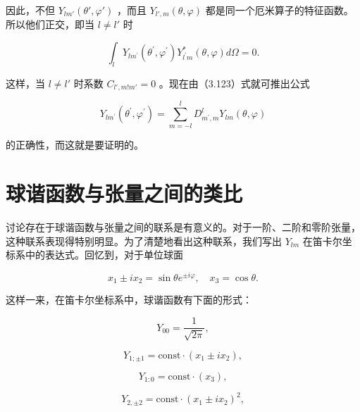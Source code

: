 因此，不但 $Y_{lm'}(\theta', \varphi')$ ，而且 $Y_{l',m}(\theta, \varphi)$ 都是同一个厄米算子的特征函数。所以他们正交，即当 $l \neq l'$ 时

\begin{equation*}
\int_ {l} Y _ {l m ^ {\prime}} \left(\theta^ {\prime}, \varphi^ {\prime}\right) Y _ {l ^ {\prime} m} ^ {*} (\theta , \varphi) d \Omega = 0.
\end{equation*}

这样，当 $l \neq l'$ 时系数 $C_{l', m!m'} = 0$ 。现在由（3.123）式就可推出公式

\begin{equation*}
Y _ {l m ^ {\prime}} \left(\theta^ {\prime}, \varphi^ {\prime}\right) = \sum_ {m = - l} ^ {l} D _ {m ^ {\prime}, m} ^ {l} Y _ {l m} (\theta , \varphi)
\end{equation*}

的正确性，而这就是要证明的。

\section{球谐函数与张量之间的类比}

讨论存在于球谐函数与张量之间的联系是有意义的。对于一阶、二阶和零阶张量，这种联系表现得特别明显。为了清楚地看出这种联系，我们写出 $Y_{lm}$ 在笛卡尔坐标系中的表达式。回忆到，对于单位球面

\begin{equation*}
x _ {1} \pm i x _ {2} = \sin \theta e ^ {\pm i \varphi}, \quad x _ {3} = \cos \theta .
\end{equation*}

这样一来，在笛卡尔坐标系中，球谐函数有下面的形式：

\begin{equation*}
Y _ {0 0} = \frac {1}{\sqrt {2 \pi}},\tag{3.127a}
\end{equation*}

\begin{equation*}
Y _ {1; \pm 1} = \mathrm{const} \cdot (x _ {1} \pm i x _ {2}),\tag{3.127b}
\end{equation*}

\begin{equation*}
Y _ {1: 0} = \mathrm{const} \cdot (x _ {3}),\tag{3.127c}
\end{equation*}

\begin{equation*}
Y _ {2, \pm 2} = \mathrm{const} \cdot (x _ {1} \pm i x _ {2}) ^ {2},\tag{3.127d}
\end{equation*}

